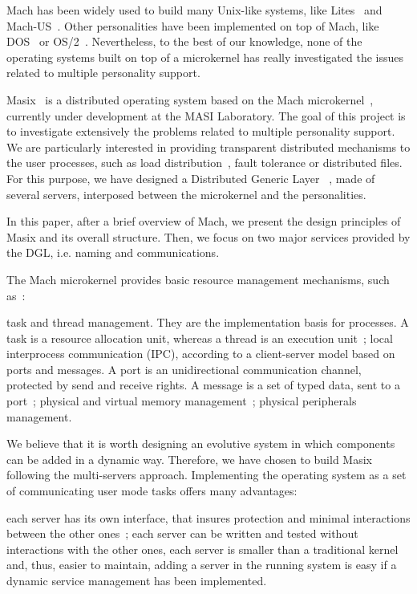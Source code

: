 Mach has been widely used to build many Unix-like systems, like
Lites~\cite{Helander94} and Mach-US~\cite{mach-us95}. Other personalities
have been implemented on top of Mach, like DOS~\cite{dos91} or 
OS/2~\cite{Phelan93}.
Nevertheless, to the best of our knowledge, none of the operating systems 
built on top of a microkernel has really investigated the issues related 
to multiple personality support.

Masix~\cite{caracas94} is a distributed operating system based on the 
Mach microkernel~\cite{mach:foundation}, currently under development at the 
MASI Laboratory.
The goal of this project is to investigate extensively the problems related 
to multiple personality support. 
We are particularly interested in providing transparent
distributed mechanisms to the user processes, such as load distribution~\cite{paris95}, 
fault tolerance or distributed files. 
For this purpose, we have designed a Distributed Generic Layer~\cite{athens95}
, made of several servers, interposed between the microkernel and 
the personalities.

In this paper, after a brief overview of Mach, we present the design 
principles of Masix and its overall structure. Then, we focus on
two major services provided by the DGL, i.e. naming and communications.


The Mach microkernel provides basic resource management mechanisms, such as~:
\begin{itemize}
\myitem task and thread management. They are the implementation basis for
processes. A task is a resource allocation unit, whereas a thread is an
execution unit~;
\myitem local interprocess communication (IPC), according to a client-server model
 based on ports and messages. A port is an unidirectional communication channel,
protected by send and receive rights. A message is a set of typed data, sent to
a port~;
\myitem physical and virtual memory management~;
\myitem physical peripherals management.
\end{itemize}



We believe that it is worth designing an evolutive system in which
components can be added in a dynamic way. Therefore, we have chosen 
to build Masix following the multi-servers approach. 
Implementing the operating system as a set of communicating user mode 
tasks offers many advantages:
\begin {itemize}
\myitem each server has its own interface, that insures protection and minimal
interactions between the other ones~;
\myitem each server can be written and tested without interactions with the
other ones,
\myitem each server is smaller than a traditional kernel and, thus, easier
to maintain,
\myitem adding a server in the running system is easy if a dynamic service
management has been implemented.
\end {itemize}

